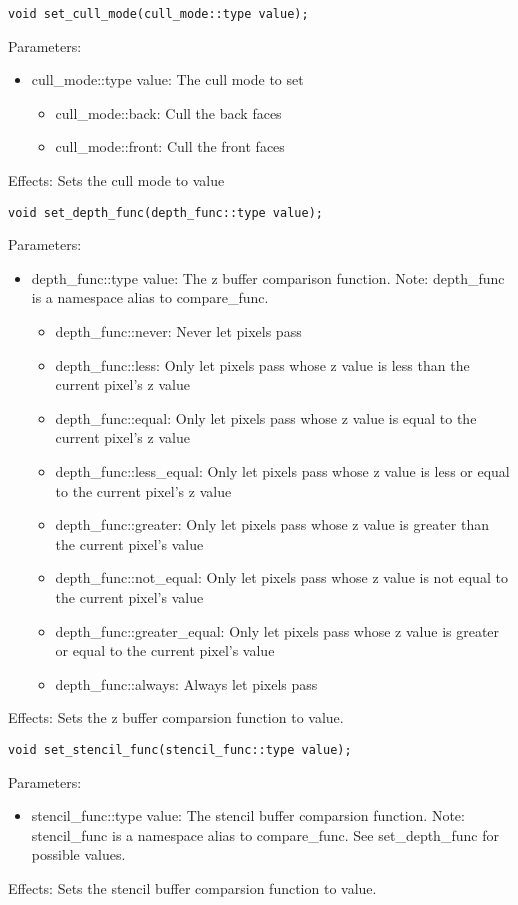 \documentclass{article}
\begin{document}
\begin{lstlisting}
void set_cull_mode(cull_mode::type value);
\end{lstlisting}
Parameters:
\begin{itemize}
\item cull\_mode::type value: The cull mode to set
  \begin{itemize}
  \item cull\_mode::back: Cull the back faces
  \item cull\_mode::front: Cull the front faces
  \end{itemize}
\end{itemize}
Effects: Sets the cull mode to value

\begin{lstlisting}
void set_depth_func(depth_func::type value);
\end{lstlisting}
Parameters:
\begin{itemize}
\item depth\_func::type value: The z buffer comparison function.
  Note: depth\_func is a namespace alias to compare\_func.
  \begin{itemize}
  \item depth\_func::never: Never let pixels pass
  \item depth\_func::less: Only let pixels pass whose z value is less than the current pixel's z value
  \item depth\_func::equal: Only let pixels pass whose z value is equal to the current pixel's z value
  \item depth\_func::less\_equal: Only let pixels pass whose z value is less or equal to the current pixel's z value
  \item depth\_func::greater: Only let pixels pass whose z value is greater than the current pixel's value
  \item depth\_func::not\_equal: Only let pixels pass whose z value is not equal to the current pixel's value
  \item depth\_func::greater\_equal: Only let pixels pass whose z value is greater or equal to the current pixel's value
  \item depth\_func::always: Always let pixels pass
  \end{itemize}
\end{itemize}
Effects: Sets the z buffer comparsion function to value.

\begin{lstlisting}
void set_stencil_func(stencil_func::type value);
\end{lstlisting}
Parameters:
\begin{itemize}
\item stencil\_func::type value: The stencil buffer comparsion function.
  Note: stencil\_func is a namespace alias to compare\_func. See set\_depth\_func for possible values.
\end{itemize}
Effects: Sets the stencil buffer comparsion function to value.
\end{document}
